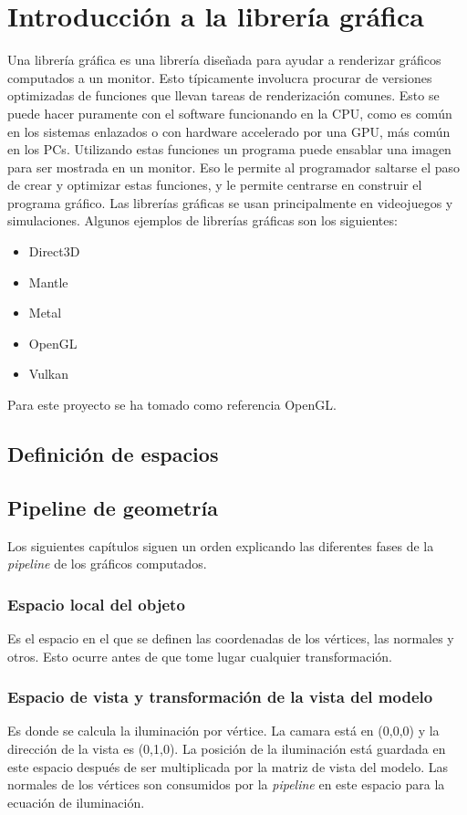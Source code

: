 \chapter{Introducción a la librería gráfica}
Una librería gráfica es una librería diseñada para ayudar a renderizar gráficos computados a un monitor. Esto típicamente involucra procurar de versiones optimizadas de funciones que llevan tareas de renderización comunes. Esto se puede hacer puramente con el software funcionando en la CPU, como es común en los sistemas enlazados o con hardware accelerado por una GPU, más común en los PCs. Utilizando estas funciones un programa puede ensablar una imagen para ser mostrada en un monitor. Eso le permite al programador saltarse el paso de crear y optimizar estas funciones, y le permite centrarse en construir el programa gráfico. Las librerías gráficas se usan principalmente en videojuegos y simulaciones.
Algunos ejemplos de librerías gráficas son los siguientes:
\begin{itemize}
\item{Direct3D}
\item{Mantle}
\item{Metal}
\item{OpenGL}
\item{Vulkan}
\end{itemize}
Para este proyecto se ha tomado como referencia OpenGL.
\section{Definición de espacios}
\section{Pipeline de geometría}
Los siguientes capítulos siguen un orden explicando las diferentes fases de la \textit{pipeline} de los gráficos computados.
\subsection{Espacio local del objeto}
Es el espacio en el que se definen las coordenadas de los vértices, las normales y otros. Esto ocurre antes de que tome lugar cualquier transformación.
\subsection{Espacio de vista y transformación de la vista del modelo}
Es donde se calcula la iluminación por vértice. La camara está en (0,0,0) y la dirección de la vista es (0,1,0). La posición de la iluminación está guardada en este espacio después de ser multiplicada por la matriz de vista del modelo. Las normales de los vértices son consumidos por la \textit{pipeline} en este espacio para la ecuación de iluminación.
